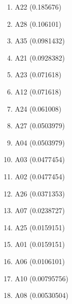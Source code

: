 \begin{enumerate}
\item A22 (0.185676)
\item A28 (0.106101)
\item A35 (0.0981432)
\item A21 (0.0928382)
\item A23 (0.071618)
\item A12 (0.071618)
\item A24 (0.061008)
\item A27 (0.0503979)
\item A04 (0.0503979)
\item A03 (0.0477454)
\item A02 (0.0477454)
\item A26 (0.0371353)
\item A07 (0.0238727)
\item A25 (0.0159151)
\item A01 (0.0159151)
\item A06 (0.0106101)
\item A10 (0.00795756)
\item A08 (0.00530504)
\end{enumerate}